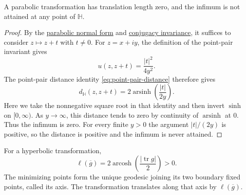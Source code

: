 \begin{proposition}\label{hyperbolic.parabolic-length}
A parabolic transformation has translation length zero, and the infimum is not attained at any point of $\mathbb H$.
\end{proposition}

\begin{proof}
By the \hyperref[hyperbolic.parabolic-normal-form]{parabolic normal form} and \hyperref[hyperbolic.translation-length-conjugacy]{conjugacy invariance}, it suffices to consider $z\mapsto z+t$ with $t\ne0$. For $z=x+iy$, the definition of the point-pair invariant gives
\[
 u(z,z+t)=\frac{|t|^2}{4y^2}.
\]
The point-pair distance identity \eqref{eq:point-pair-distance} therefore gives
\[
 d_{\mathbb H}(z,z+t)=2\operatorname{arsinh}\!\left(\frac{|t|}{2y}\right).
\]
Here we take the nonnegative square root in that identity and then invert $\sinh$ on $[0,\infty)$. As $y\to\infty$, this distance tends to zero by continuity of $\operatorname{arsinh}$ at $0$. Thus the infimum is zero. For every finite $y>0$ the argument $|t|/(2y)$ is positive, so the distance is positive and the infimum is never attained.
\end{proof}

\begin{proposition}\label{hyperbolic.hyperbolic-length}
For a hyperbolic transformation,
\[
 \ell(\overline g)=2\operatorname{arcosh}\!\left(\frac{|\operatorname{tr}g|}{2}\right)>0.
\]
The minimizing points form the unique geodesic joining its two boundary fixed points, called its axis. The transformation translates along that axis by $\ell(\overline g)$.
\end{proposition}

